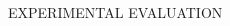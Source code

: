 \documentclass[%
  final,%
  english,%
]{beamer}
\begin{document}
\begin{frame}[t, fragile = singleslide]
\begin{columns}[t, onlytextwidth]
\begin{column}{\textwidth}
\begin{block}{EXPERIMENTAL EVALUATION}
\begin{columns}
\begin{column}{0.48\textwidth}




\end{column}
\end{columns}
\end{block}
\end{column}
\end{columns}
\end{frame}
\end{document}
